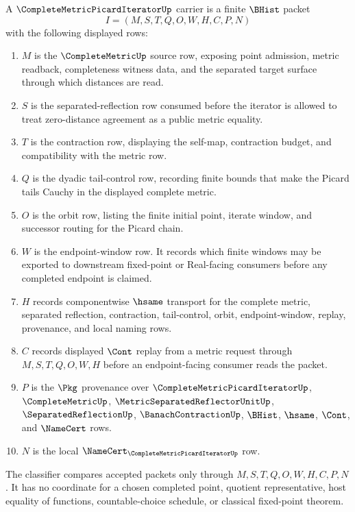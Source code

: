 \begin{definition}
\label{def:complete-metric-picard-iterator-carrier}
A $\CompleteMetricPicardIteratorUp$ carrier is a finite $\BHist$ packet
$$
I=(M,S,T,Q,O,W,H,C,P,N)
$$
with the following displayed rows:
\begin{enumerate}
\item $M$ is the $\CompleteMetricUp$ source row, exposing point admission, metric readback, completeness witness data, and the separated target surface through which distances are read.
\item $S$ is the separated-reflection row consumed before the iterator is allowed to treat zero-distance agreement as a public metric equality.
\item $T$ is the contraction row, displaying the self-map, contraction budget, and compatibility with the metric row.
\item $Q$ is the dyadic tail-control row, recording finite bounds that make the Picard tails Cauchy in the displayed complete metric.
\item $O$ is the orbit row, listing the finite initial point, iterate window, and successor routing for the Picard chain.
\item $W$ is the endpoint-window row. It records which finite windows may be exported to downstream fixed-point or Real-facing consumers before any completed endpoint is claimed.
\item $H$ records componentwise $\hsame$ transport for the complete metric, separated reflection, contraction, tail-control, orbit, endpoint-window, replay, provenance, and local naming rows.
\item $C$ records displayed $\Cont$ replay from a metric request through $M,S,T,Q,O,W,H$ before an endpoint-facing consumer reads the packet.
\item $P$ is the $\Pkg$ provenance over $\CompleteMetricPicardIteratorUp$, $\CompleteMetricUp$, $\MetricSeparatedReflectorUnitUp$, $\SeparatedReflectionUp$, $\BanachContractionUp$, $\BHist$, $\hsame$, $\Cont$, and $\NameCert$ rows.
\item $N$ is the local $\NameCert_{\CompleteMetricPicardIteratorUp}$ row.
\end{enumerate}
The classifier compares accepted packets only through $M,S,T,Q,O,W,H,C,P,N$. It has no coordinate for a chosen completed point, quotient representative, host equality of functions, countable-choice schedule, or classical fixed-point theorem.
\end{definition}

